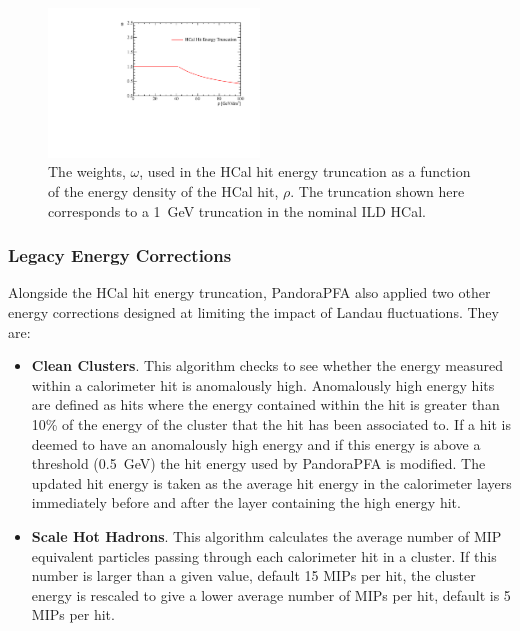 \begin{figure}[h!]
\includegraphics[width=0.5\textwidth]{EnergyEstimators/Plots/SoftComp/Weights/CellTruncWeights.pdf}
\caption[The weights, $\omega$, used in the HCal hit energy truncation as a function of the energy density of the HCal hit, $\rho$.  The truncation shown here corresponds to a 1~GeV truncation in the nominal ILD HCal.]{The weights, $\omega$, used in the HCal hit energy truncation as a function of the energy density of the HCal hit, $\rho$.  The truncation shown here corresponds to a 1~GeV truncation in the nominal ILD HCal.}
\label{fig:hcalcellweight}
\end{figure}


\subsubsection{Legacy Energy Corrections}
\label{sec:legacycorrections}
Alongside the HCal hit energy truncation, PandoraPFA also applied two other energy corrections designed at limiting the impact of Landau fluctuations.  They are:

\begin{itemize}
\item \textbf{Clean Clusters}.  This algorithm checks to see whether the energy measured within a calorimeter hit is anomalously high.  Anomalously high energy hits are defined as hits where the energy contained within the hit is greater than 10\% of the energy of the cluster that the hit has been associated to.  If a hit is deemed to have an anomalously high energy and if this energy is above a threshold (0.5~GeV) the hit energy used by PandoraPFA is modified.  The updated hit energy is taken as the average hit energy in the calorimeter layers immediately before and after the layer containing the high energy hit.    
\item \textbf{Scale Hot Hadrons}.  This algorithm calculates the average number of MIP equivalent particles passing through each calorimeter hit in a cluster.  If this number is larger than a given value, default 15 MIPs per hit, the cluster energy is rescaled to give a lower average number of MIPs per hit, default is 5 MIPs per hit.  
\end{itemize}

